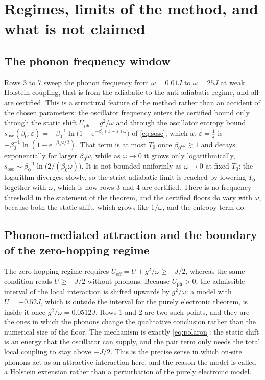 \documentclass[11pt]{article}
\numberwithin{equation}{section}
\newcommand{\e}{\mathrm{e}}
\newcommand{\eff}{\mathrm{eff}}
\theoremstyle{definition}
\begin{document}
\section{Regimes, limits of the method, and what is not claimed}\label{sec:scope}

\subsection{The phonon frequency window}

Rows 3 to 7 sweep the phonon frequency from $\omega=0.01J$ to $\omega=25J$ at weak
Holstein coupling, that is from the adiabatic to the anti-adiabatic regime, and all are
certified. This is a structural feature of the method rather than an accident of the
chosen parameters: the oscillator frequency enters the certified bound only through the
static shift $U_{\mathrm{ph}}=g^{2}/\omega$ and through the oscillator entropy bound
$s_{\mathrm{osc}}(\beta_0,\varepsilon)=-\beta_0^{-1}\ln\big(1-\e^{-\beta_0(1-\varepsilon)\omega}\big)$
of \eqref{eq:sosc}, which at $\varepsilon=\frac12$ is
$-\beta_0^{-1}\ln(1-\e^{-\beta_0\omega/2})$. That term is at most $T_0$ once
$\beta_0\omega\gtrsim1$ and decays exponentially for larger $\beta_0\omega$, while as
$\omega\to0$ it grows only logarithmically,
$s_{\mathrm{osc}}\sim\beta_0^{-1}\ln\big(2/(\beta_0\omega)\big)$. It is not bounded
uniformly as $\omega\to0$ at fixed $T_0$: the logarithm diverges, slowly, so the strict
adiabatic limit is reached by lowering $T_0$ together with $\omega$, which is how rows 3
and 4 are certified. There is no frequency threshold in the statement of the theorem, and
the certified floors do vary with $\omega$, because both the static shift, which grows
like $1/\omega$, and the entropy term do.

\subsection{Phonon-mediated attraction and the boundary of the zero-hopping regime}

The zero-hopping regime requires $U_{\eff}=U+g^{2}/\omega\ge-J/2$, whereas the same
condition reads $U\ge-J/2$ without phonons. Because $U_{\mathrm{ph}}>0$, the admissible
interval of the local interaction is shifted upwards by $g^{2}/\omega$: a model with
$U=-0.52J$, which is outside the interval for the purely electronic theorem, is inside it
once $g^{2}/\omega=0.0512J$. Rows 1 and 2 are two such points, and they are the ones in
which the phonons change the qualitative conclusion rather than the numerical size of the
floor. The mechanism is exactly \eqref{eq:polaron}: the static shift is an energy that the oscillator
can supply, and the pair term only needs the total local coupling to stay above
$-J/2$. This is the precise sense in which on-site phonons act as an attractive
interaction here, and the reason the model is called a Holstein extension rather than a
perturbation of the purely electronic model.
\end{document}
